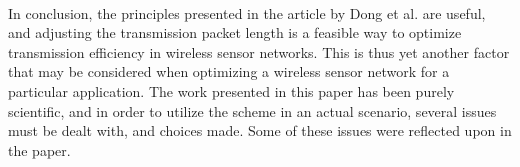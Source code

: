 \\[8pt]
In conclusion, the principles presented in the article by Dong et al. \cite{DPLCpaper} are useful, and adjusting the transmission packet length is a feasible way to optimize transmission efficiency in wireless sensor networks. This is thus yet another factor that may be considered when optimizing a wireless sensor network for a particular application. The work presented in this paper has been purely scientific, and in order to utilize the scheme in an actual scenario, several issues must be dealt with, and choices made. Some of these issues were reflected upon in the paper.
